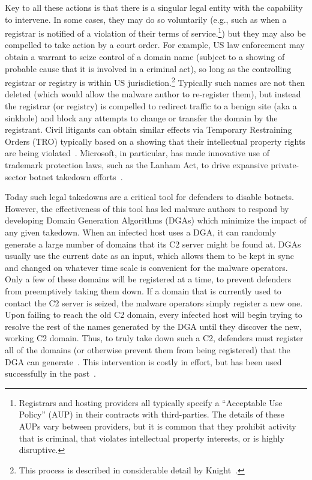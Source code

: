 Key to all these actions is that there is a singular legal entity with
the capability to intervene.  In some cases, they may do so
voluntarily (e.g., such as when a registrar is notified of a violation
of their terms of service.\footnote{Registrars and hosting providers
  all typically specify a ``Acceptable Use Policy'' (AUP) in their
  contracts with third-parties.  The details of these AUPs vary
  between providers, but it is common that they prohibit activity that
  is criminal, that violates intellectual property interests, or is
  highly disruptive.}) but they may also be compelled to take action
by a court order.  For example, US law enforcement may obtain a
warrant to seize control of a domain name (subject to a showing of
probable cause that it is involved in a criminal act), so long as the
controlling registrar or registry is within US
jurisdiction.\footnote{This process is described in considerable
  detail by Knight~\cite{knight_domain_2015}.}  Typically such names
are not then deleted (which would allow the malware author to
re-register them), but instead the registrar (or registry) is
compelled to redirect traffic to a benign site (aka a sinkhole) and
block any attempts to change or transfer the domain by the registrant.
Civil litigants can obtain similar effects via Temporary Restraining
Orders (TRO) typically based on a showing that their intellectual
property rights are being violated~\cite{kesari_deterring_2017}.
Microsoft, in particular, has made innovative use of trademark
protection laws, such as the Lanham Act, to drive expansive
private-sector botnet takedown efforts~\cite{lerner_microsoft_2014}.

Today such legal takedowns are a critical tool for defenders to
disable botnets.  However, the effectiveness of this tool has led
malware authors to respond by developing Domain Generation Algorithms
(DGAs) which minimize the impact of any given takedown. When an
infected host uses a DGA, it can randomly generate a large number of
domains that its C2 server might be found at. DGAs usually use the
current date as an input, which allows them to be kept in sync and
changed on whatever time scale is convenient for the malware
operators. Only a few of these domains will be registered at a time,
to prevent defenders from preemptively taking them down. If a domain
that is currently used to contact the C2 server is seized, the malware
operators simply register a new one. Upon failing to reach the old C2
domain, every infected host will begin trying to resolve the rest of
the names generated by the DGA until they discover the new, working C2
domain. Thus, to truly take down such a C2, defenders must 
register all
of the domains (or otherwise prevent them from being registered) that
the DGA can generate~\cite{antonakakis_throw-away_2012}. This
intervention is costly in effort, but has been used 
successfully in the past~\cite{piscitello_conficker}.


